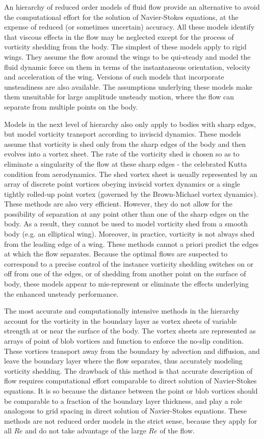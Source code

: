 An hierarchy of reduced order models of fluid flow provide an alternative to avoid the computational effort for the solution of Navier-Stokes equations, at the expense of reduced (or sometimes uncertain) accuracy.
All these models identify that viscous effects in the flow may be neglected except for the process of vorticity shedding from the body.
The simplest of these models apply to rigid wings.
They assume the flow around the wings to be qui-steady and model the fluid dynamic force on them in terms of the instantaneous orientation, velocity and acceleration of the wing.
Versions of such models that incorporate unsteadiness are also available.
The assumptions underlying these models make them unsuitable for large amplitude unsteady motion, where the flow can separate from multiple points on the body.

Models in the next level of hierarchy also only apply to bodies with sharp edges, but model vorticity transport according to inviscid dynamics.
These models assume that vorticity is shed only from the sharp edges of the body and then evolves into a vortex sheet.
The rate of the vorticity shed is chosen so as to eliminate a singularity of the flow at these sharp edges - the celebrated Kutta condition from aerodynamics.
The shed vortex sheet is usually represented by an array of discrete point vortices obeying inviscid vortex dynamics or a single tightly rolled-up point vortex (governed by the Brown-Michael vortex dynamics).
These methods are also very efficient.
However, they do not allow for the possibility of separation at any point other than one of the sharp edges on the body.
As a result, they cannot be used to model vorticity shed from a smooth body (e.g. an elliptical wing).
Moreover, in practice, vorticity is not always shed from the leading edge of a wing.
These methods cannot a priori predict the edges at which the flow separates.
Because the optimal flows are suspected to correspond to a precise control of the instance vorticity shedding switches on or off from one of the edges, or of shedding from another point on the surface of body, these models appear to mis-represent or eliminate the effects underlying the enhanced unsteady performance.

The most accurate and computationally intensive methods in the hierarchy account for the vorticity in the boundary layer as vortex sheets of variable strength at or near the surface of the body.
The vortex sheets are represented as arrays of point of blob vortices and function to enforce the no-slip condition.
These vortices transport away from the boundary by advection and diffusion, and leave the boundary layer where the flow separates, thus accurately modeling vorticity shedding.
The drawback of this method is that accurate description of flow requires computational effort comparable to direct solution of Navier-Stokes equations.
It is so because the distance between the point or blob vortices should be comparable to a fraction of the boundary layer thickness, and play a role analogous to grid spacing in direct solution of Navier-Stokes equations.
These methods are not reduced order models in the strict sense, because they apply for all $Re$ and do not take advantage of the large $Re$ of the flow.
